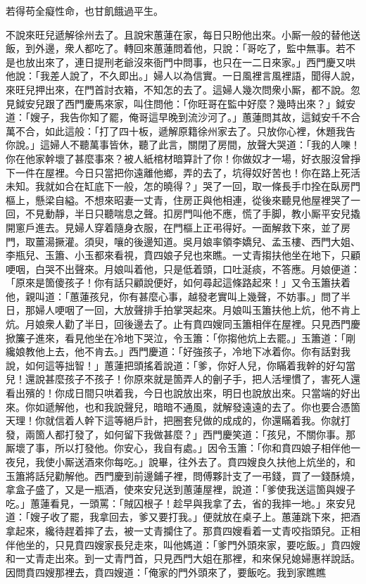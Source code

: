 \begin{myquote}
若得苟全癡性命，也甘飢餓過平生。
\end{myquote}

不說來旺兒遞解徐州去了。且說宋蕙蓮在家，每日只盼他出來。小厮一般的替他送飯，到外邊，衆人都吃了。轉回來蕙蓮問着他，只說：「哥吃了，監中無事。若不是也放出來了，連日提刑老爺沒來衙門中問事，也只在一二日來家。」西門慶又哄他說：「我差人說了，不久即出。」婦人以為信實。一日風裡言風裡語，聞得人說，來旺兒押出來，在門首討衣箱，不知怎的去了。這婦人幾次問衆小厮，都不說。忽見鉞安兒跟了西門慶馬來家，叫住問他：「你旺哥在監中好麼？幾時出來？」鉞安道：「嫂子，我告你知了罷，俺哥這早晚到流沙河了。」蕙蓮問其故，這鉞安千不合萬不合，如此這般：「打了四十板，遞解原籍徐州家去了。只放你心裡，休題我告你說。」這婦人不聽萬事皆休，聽了此言，關閉了房間，放聲大哭道：「我的人嚛！你在他家幹壞了甚麼事來？被人紙棺材暗算計了你！你做奴才一場，好衣服沒曾掙下一件在屋裡。今日只當把你遠離他鄉，弄的去了，坑得奴好苦也！你在路上死活未知。我就如合在缸底下一般，怎的曉得？」{}哭了一回，取一條長手巾拴在臥房門樞上，懸梁自縊。不想來昭妻一丈青，住房正與他相連，從後來聽見他屋裡哭了一回，不見動靜，半日只聽喘息之聲。扣房門叫他不應，慌了手脚，教小厮平安兒撬開窻戶進去。見婦人穿着隨身衣服，在門樞上正弔得好。一面解救下來，並了房門，取薑湯撅灌。須臾，嚷的後邊知道。吳月娘率領李嬌兒、孟玉樓、西門大姐、李瓶兒、玉簫、小玉都來看視，賁四娘子兒也來瞧。一丈青搊扶他坐在地下，只顧哽咽，白哭不出聲來。月娘叫着他，只是低着頭，口吐涎痰，不答應。月娘便道：「原來是箇傻孩子！你有話只顧說便好，如何尋起這條路起來！」又令玉簫扶着他，親叫道：「蕙蓮孩兒，你有甚麼心事，越發老實叫上幾聲，不妨事。」{}問了半日，那婦人哽咽了一回，大放聲排手拍掌哭起來。月娘叫玉簫扶他上炕，他不肯上炕。月娘衆人勸了半日，回後邊去了。止有賁四嫂同玉簫相伴在屋裡。只見西門慶掀簾子進來，看見他坐在冷地下哭泣，令玉簫：「你搊他炕上去罷。」玉簫道：「剛纔娘教他上去，他不肯去。」西門慶道：「好強孩子，冷地下冰着你。你有話對我說，如何這等拙智！」蕙蓮把頭搖着說道：「爹，你好人兒，你瞞着我幹的好勾當兒！還說甚麼孩子不孩子！你原來就是箇弄人的劊子手，把人活埋慣了，害死人還看出殯的！{}你成日間只哄着我，今日也說放出來，明日也說放出來。只當端的好出來。你如遞解他，也和我說聲兒，暗暗不通風，就解發遠遠的去了。你也要合憑箇天理！你就信着人幹下這等絕戶計，把圈套兒做的成成的，你還瞞着我。你就打發，兩箇人都打發了，如何留下我做甚麼？」{}西門慶笑道：「孩兒，不關你事。那厮壞了事，所以打發他。你安心，我自有處。」因令玉簫：「你和賁四娘子相伴他一夜兒，我使小厮送酒來你每吃。」說畢，往外去了。賁四嫂良久扶他上炕坐的，和玉簫將話兒勸解他。西門慶到前邊鋪子裡，問傅夥計支了一弔錢，買了一錢酥燒，拿盒子盛了，又是一瓶酒，使來安兒送到蕙蓮屋裡，說道：「爹使我送這箇與嫂子吃。」蕙蓮看見，一頭罵：「賊囚根子！趁早與我拿了去，省的我摔一地。」{}來安兒道：「嫂子收了罷，我拿回去，爹又要打我。」便就放在桌子上。蕙蓮跳下來，把酒拿起來，纔待趕着摔了去，被一丈青攔住了。那賁四嫂看着一丈青咬指頭兒。正相伴他坐的，只見賁四嫂家長兒走來，叫他媽道：「爹門外頭來家，要吃飯。」賁四嫂和一丈青走出來。到一丈青門首，只見西門大姐在那裡，和來保兒媳婦惠祥說話。因問賁四嫂那裡去，賁四嫂道：「俺家的門外頭來了，要飯吃。我到家瞧瞧